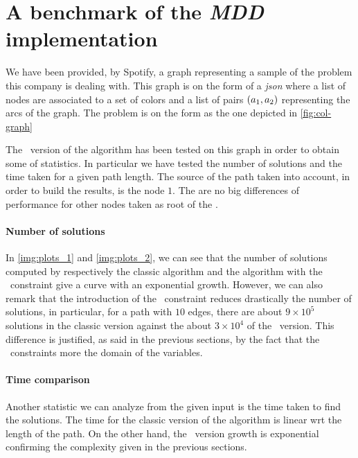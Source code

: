 \section{A benchmark of the \textit{MDD} implementation}

We have been provided, by Spotify, a graph representing a sample of the problem this company is dealing with. This graph is on the form of a \textit{json} where a list of nodes are associated to a set of colors and a list of pairs $(a_1, a_2)$ representing the arcs of the graph. The problem is on the form as the one depicted in \cref{fig:col-graph}

The \mdd\ version of the algorithm has been tested on this graph in order to obtain some of statistics. In particular we have tested the number of solutions and the time taken for a given path length. The source of the path taken into account, in order to build the results, is the node $1$. The are no big differences of performance for other nodes taken as root of the \mdd.



\paragraph{Number of solutions}
In \cref{img:plots_1} and \cref{img:plots_2}, we can see that the number of solutions computed by respectively the classic algorithm and the algorithm with the \alldiff\ constraint give a curve with an exponential growth. However, we can also remark that the introduction of the \alldiff\ constraint reduces drastically the number of solutions, in particular, for a path with $10$ edges, there are about $9 \times 10^5$ solutions in the classic version against the about $3 \times 10^4$ of the \alldiff\ version. This difference is justified, as said in the previous sections, by the fact that the \alldiff\ constraints more the domain of the variables.

\paragraph{Time comparison} Another statistic we can analyze from the given input is the time taken to find the solutions. The time for the classic version of the algorithm is linear wrt the length of the path. On the other hand, the \alldiff\ version growth is exponential confirming the complexity given in the previous sections.

